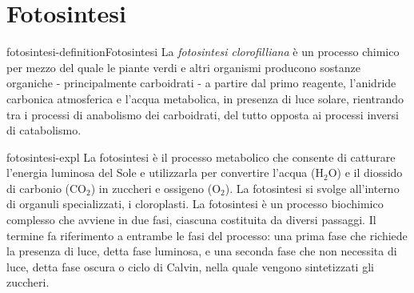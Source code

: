 \documentclass[preview]{standalone}
\begin{document}
\genpage

\section{Fotosintesi}

\begin{snippetdefinition}{fotosintesi-definition}{Fotosintesi}
    La \textit{fotosintesi clorofilliana} è un processo chimico per mezzo del quale
    le piante verdi e altri organismi producono sostanze organiche -
    principalmente carboidrati - a partire dal primo reagente,
    l'anidride carbonica atmosferica e l'acqua metabolica,
    in presenza di luce solare, rientrando tra i processi di anabolismo dei carboidrati,
    del tutto opposta ai processi inversi di catabolismo.
\end{snippetdefinition}

\begin{snippet}{fotosintesi-expl}
    La fotosintesi è il processo metabolico che consente di catturare l'energia luminosa del Sole
    e utilizzarla per convertire l'acqua (H\({}_2\)O) e il diossido di carbonio (CO\({}_2\)) in zuccheri e
    ossigeno (O\({}_2\)). La fotosintesi si svolge all'interno di organuli specializzati, i cloroplasti. La
    fotosintesi è un processo biochimico complesso che avviene in due fasi, ciascuna costituita
    da diversi passaggi. Il termine  fa riferimento a entrambe le fasi del processo:
    una prima fase che richiede la presenza di luce, detta fase luminosa, e una seconda fase
    che non necessita di luce, detta fase oscura o ciclo di Calvin, nella quale vengono sintetizzati
    gli zuccheri.
\end{snippet}
\end{document}
